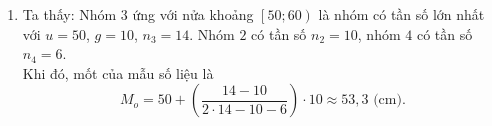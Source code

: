 \begin{bt}
{\begin{enumerate}
\begin{itemize}
				Xét nhóm $2$ là nhóm $\left[40;50\right)$ có $s=40$, $h=10$, $n_2=10$ và nhóm $1$ có $cf_1 = 4$.\\
				Khi đó, tứ phân vị thứ nhất là
				\[
				Q_1 = 40 + \dfrac{10 - 4}{10} \cdot 10 = 46\text{ (cm)}.
				\]
				\item Ta có $\dfrac{3n}{4} = 30$, mà $28 < 30 < 34$ nên nhóm $4$ là nhóm đầu tiên có tần số tích luỹ lớn hơn hoặc bằng $30$. \\
				Xét nhóm $4$ là nhóm $\left[60;70\right)$ có $t = 60$, $l = 10$, $n_4 = 6$ và nhóm $3$ có $cf_3 = 28$.\\
				Khi đó, tứ phân vị thứ ba là
				\[
				Q_3 = 60 + \dfrac{30 - 28}{6} \cdot 10 \approx 63{,}3\text{ (cm)}.
				\]
			\end{itemize}
			Vậy $55{,}5\text{ (cm)}$ là trung bình mẫu, $54{,}3\text{ (cm)}$ là trung vị của mẫu và $Q_1 = 46\text{ (cm)}$, $Q_2 = 54{,}3\text{ (cm)}$, $Q_3 = 63{,}3\text{ (cm)}$ là tứ phân vị của mẫu.
			\item Ta thấy: Nhóm $3$ ứng với nửa khoảng $\left[50;60\right)$ là nhóm có tần số lớn nhất với $u=50$, $g=10$, $n_3 = 14$. Nhóm $2$ có tần số $n_2 = 10$, nhóm $4$ có tần số $n_4 = 6$.\\
			Khi đó, mốt của mẫu số liệu là 
			\[
			M_o = 50 + \left( \dfrac{14 - 10}{2\cdot 14 - 10 - 6} \right) \cdot 10 \approx 53{,}3\text{ (cm)}.
			\]
		\end{enumerate}
	}
\end{bt}

